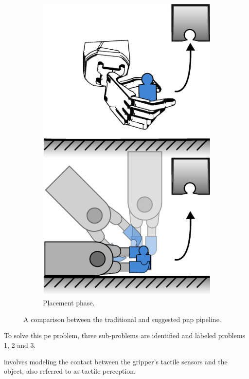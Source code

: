 \begin{figure}[h]
\begin{subfigure}[b]{0.24\textwidth}
		\includegraphics[width=\textwidth]{chapters/introduction/fig/pipeline-4.pdf}
		\caption{Placement phase.}
		\label{fig:placement-phase}
	\end{subfigure}
		\caption{A comparison between the traditional and suggested \gls{pnp} pipeline.}
		\label{fig:pnp-pipeline}
\end{figure}


To solve this \gls{pe} problem, three sub-problems are identified and labeled problems \num{1}, \num{2} and \num{3}.
\begin{problem} \label{prob:1}
	\normalfont involves modeling the contact between the gripper's tactile sensors and the object, also referred to as tactile perception. 
\end{problem}

